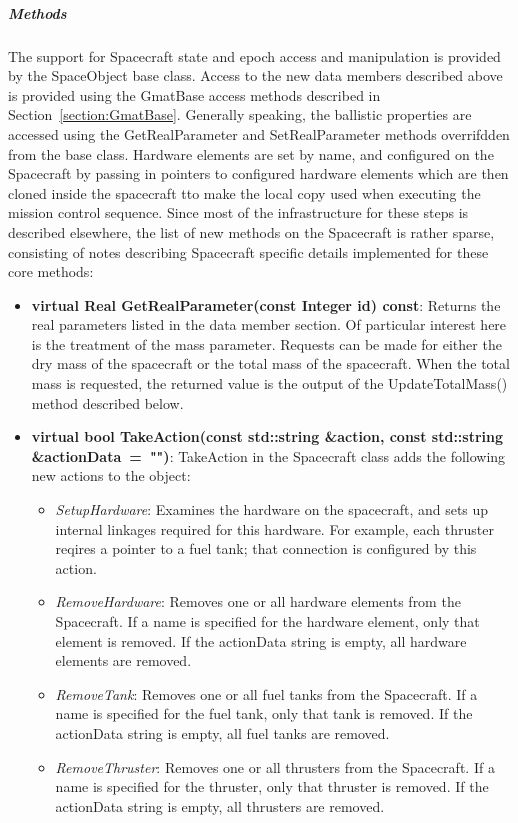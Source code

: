 \subparagraph{\textit{Methods}}

The support for Spacecraft state and epoch access and manipulation is provided by the SpaceObject
base class.  Access to the new data members described above is provided using the GmatBase access
methods described in Section~\ref{section:GmatBase}.  Generally speaking, the ballistic properties
are accessed using the GetRealParameter and SetRealParameter methods overrifdden from the base
class.  Hardware elements are set by name, and configured on the Spacecraft by passing in pointers
to configured hardware elements which are then cloned inside the spacecraft tto make the local copy
used when executing the mission control sequence.  Since most of the infrastructure for these steps
is described elsewhere, the list of new methods on the Spacecraft is rather sparse, consisting of
notes describing Spacecraft specific details implemented for these core methods:

\begin{itemize}
\item \textbf{virtual Real GetRealParameter(const Integer id) const}: Returns the real
parameters listed in the data member section.  Of particular interest here is the treatment of the
mass parameter.  Requests can be made for either the dry mass of the spacecraft or the total mass
of the spacecraft.  When the total mass is requested, the returned value is the output of the
UpdateTotalMass() method described below.
\item \textbf{virtual bool TakeAction(const std::string \&action, const std::string
\&actionData~=~"")}: TakeAction in the Spacecraft class adds the following new actions to the
object:
\begin{itemize}
\item \textit{SetupHardware}: Examines the hardware on the spacecraft, and sets up internal
linkages required for this hardware.  For example, each thruster reqires a pointer to a fuel tank;
that connection is configured by this action.
\item \textit{RemoveHardware}: Removes one or all hardware elements from the Spacecraft.  If a name
is specified for the hardware element, only that element is removed.  If the actionData string is
empty, all hardware elements are removed.
\item \textit{RemoveTank}: Removes one or all fuel tanks from the Spacecraft.  If a name is
specified for the fuel tank, only that tank is removed.  If the actionData string is empty, all fuel
tanks are removed.
\item \textit{RemoveThruster}: Removes one or all thrusters from the Spacecraft.  If a name is
specified for the thruster, only that thruster is removed.  If the actionData string is empty, all
thrusters are removed.
\end{itemize}
\end{itemize}

